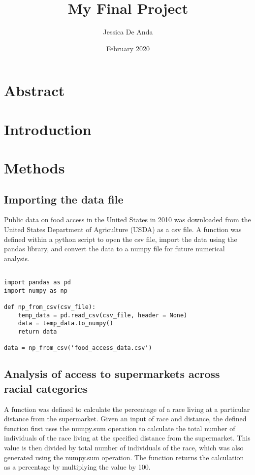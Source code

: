 \documentclass[letterpaper]{article}
\title{My Final Project}
\author{Jessica De Anda}
\date{February 2020}
\begin{document}
\maketitle
\section*{Abstract}

\newpage
\tableofcontents
\listoffigures

\newpage
\section{Introduction}

\section{Methods}

\subsection{Importing the data file}

Public data on food access in the United States in 2010 was downloaded from the United States Department of Agriculture (USDA) as a csv file.  A function was defined within a python script to open the csv file, import the data using the pandas library, and convert the data to a numpy file for future numerical analysis.
\vspace{0.25cm}

\lstset{language=Python}
\begin{lstlisting}[frame=single]  

import pandas as pd
import numpy as np

def np_from_csv(csv_file):
    temp_data = pd.read_csv(csv_file, header = None)
    data = temp_data.to_numpy()
    return data

data = np_from_csv('food_access_data.csv')

\end{lstlisting}

\subsection{Analysis of access to supermarkets across racial categories}

A function was defined to calculate the percentage of a race living at a particular distance from the supermarket. Given an input of race and distance, the defined function first uses the numpy.sum operation to calculate the total number of individuals of the race living at the specified distance from the supermarket. This value is then divided by total number of individuals of the race, which was also generated using the numpy.sum operation. The function returns the calculation as a percentage by multiplying the value by 100.
\vspace{0.25cm}
\end{document}
